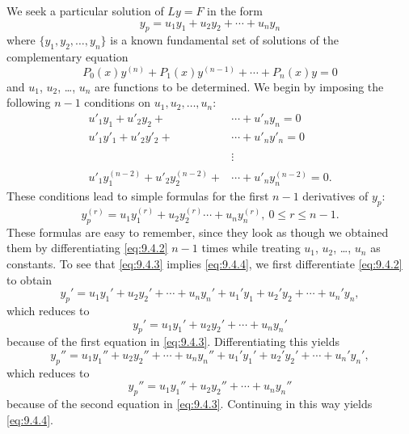 We seek a particular solution of $Ly=F$ in the form
\begin{equation} \label{eq:9.4.2}
y_p=u_1y_1+u_2y_2+\cdots+u_ny_n
\end{equation}
where $\{y_1,y_2,\dots,y_n\}$ is a known fundamental set of solutions
of the complementary equation
\[
P_0(x)y^{(n)}+P_1(x)y^{(n-1)}+\cdots+P_n(x)y=0
\]
and $u_1$, $u_2$, \dots, $u_n$ are functions to be determined. We begin by
imposing the following $n-1$ conditions on $u_1,u_2,\dots,u_n$:
\begin{equation} \label{eq:9.4.3}
\begin{aligned}
u'_1y_1+u'_2y_2+&\cdots+u'_ny_n=0 \\
u'_1y'_1+u'_2y'_2+&\cdots+u'_ny'_n=0 \\
\phantom{u'_1y^{(n_1)}+u'_2y_2^{(n-1)}}&\vdots \\
u'_1y_1^{(n-2)}+u'_2y^{(n-2)}_2+&\cdots+u'_ny^{(n-2)}_n=0.
\end{aligned}
\end{equation}
These conditions lead to simple formulas for the first $n-1$
derivatives of $y_p$:
\begin{equation} \label{eq:9.4.4}
y^{(r)}_p=u_1y^{(r)}_1+u_2y_2^{(r)}\cdots+u_ny^{(r)}_n,\ 0
\le r \le n-1.
\end{equation}
These formulas are easy to remember, since they look as though we
obtained them by differentiating \eqref{eq:9.4.2} $n-1$ times while
treating $u_1$, $u_2$, \dots, $u_n$ as constants. To see that
\eqref{eq:9.4.3}
implies \eqref{eq:9.4.4}, we first differentiate \eqref{eq:9.4.2} to obtain
\[
y_p'=u_1y_1'+u_2y_2'+\cdots+u_ny_n'+u_1'y_1+u_2'y_2+\cdots+u_n'y_n,
\]
which  reduces to
\[
y_p'=u_1y_1'+u_2y_2'+\cdots+u_ny_n'
\]
because of the first equation in \eqref{eq:9.4.3}. Differentiating this
yields
\[
y_p''=u_1y_1''+u_2y_2''+\cdots+u_ny_n''+u_1'y_1'+u_2'y_2'+\cdots+u_n'y_n',
\]
which reduces to
\[
y_p''=u_1y_1''+u_2y_2''+\cdots+u_ny_n''
\]
because of  the second equation in \eqref{eq:9.4.3}.
Continuing in this way yields \eqref{eq:9.4.4}.

